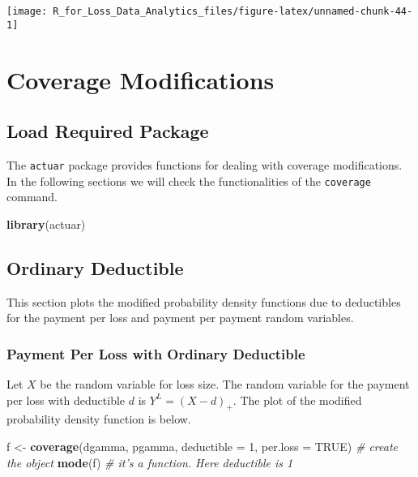 \documentclass[]{book}
\newenvironment{Shaded}{\begin{snugshade}}{\end{snugshade}}
\newcommand{\KeywordTok}[1]{\textcolor[rgb]{0.13,0.29,0.53}{\textbf{#1}}}
\newcommand{\DataTypeTok}[1]{\textcolor[rgb]{0.13,0.29,0.53}{#1}}
\newcommand{\DecValTok}[1]{\textcolor[rgb]{0.00,0.00,0.81}{#1}}
\newcommand{\StringTok}[1]{\textcolor[rgb]{0.31,0.60,0.02}{#1}}
\newcommand{\CommentTok}[1]{\textcolor[rgb]{0.56,0.35,0.01}{\textit{#1}}}
\newcommand{\OtherTok}[1]{\textcolor[rgb]{0.56,0.35,0.01}{#1}}
\newcommand{\NormalTok}[1]{#1}
\theoremstyle{definition}
\theoremstyle{definition}
\theoremstyle{definition}
\theoremstyle{remark}
\begin{document}
\begin{center}\texttt{[image: R\_for\_Loss\_Data\_Analytics\_files/figure-latex/unnamed-chunk-44-1]} \end{center}

\section{Coverage Modifications}\label{coverage-modifications}

\subsection{Load Required Package}\label{load-required-package}

The \texttt{actuar} package provides functions for dealing with coverage
modifications. In the following sections we will check the
functionalities of the \texttt{coverage} command.

\begin{Shaded}
\begin{Highlighting}[]
\KeywordTok{library}\NormalTok{(actuar)}
\end{Highlighting}
\end{Shaded}

\subsection{Ordinary Deductible}\label{ordinary-deductible}

This section plots the modified probability density functions due to
deductibles for the payment per loss and payment per payment random
variables.

\subsubsection{Payment Per Loss with Ordinary
Deductible}\label{payment-per-loss-with-ordinary-deductible}

Let \(X\) be the random variable for loss size. The random variable for
the payment per loss with deductible \(d\) is \(Y^L=(X-d)_+\). The plot
of the modified probability density function is below.

\begin{Shaded}
\begin{Highlighting}[]
\NormalTok{f <-}\StringTok{ }\KeywordTok{coverage}\NormalTok{(dgamma, pgamma, }\DataTypeTok{deductible =} \DecValTok{1}\NormalTok{, }\DataTypeTok{per.loss =} \OtherTok{TRUE}\NormalTok{)  }\CommentTok{# create the object}
\KeywordTok{mode}\NormalTok{(f)  }\CommentTok{# it's a function. Here deductible is 1}
\end{Highlighting}
\end{Shaded}
\end{document}
